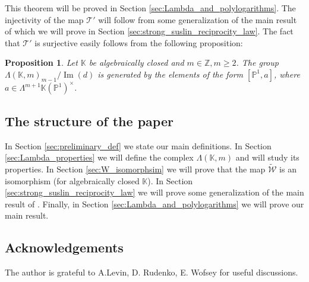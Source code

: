\documentclass[12pt]{extarticle}
\newtheorem{proposition}[theorem]{Proposition}
\def\mb{\mathbb}
\def\mc{\mathcal}
\def\L{\Lambda}
\def\k{\mb K}
\def\Z{\mb Z}
\def\t{\times}
\def\wt{\widetilde}
\renewcommand{\P}{{\mb P}}
\def\T{\mc T}
\def\W{\mc W}
\def \tW{\wt{\W}}
\def \wW{\tW}
\DeclareMathOperator{\im}{Im}
\begin{document}
This theorem will be proved in Section \ref{sec:Lambda_and_polylogarithms}. The injectivity of the map $\T'$ will follow from some generalization of the main result of \cite{bolbachan_2023_chow} which we will prove in Section \ref{sec:strong_suslin_reciprocity_law}. The fact that $\mc T'$ is surjective easily follows from the following proposition:

\begin{proposition}
\label{pr_intro:Lambda_is_generated_by_rationally_connected}
    Let $\k$ be algebraically closed and $m\in\Z, m\geq 2$. The group $\L(\k,m)_{m-1}/\im(d)$ is generated by the elements of the form $[\P^1, a]$, where  $a\in\L^{m+1}\k(\P^1)^\t$.
\end{proposition}


\subsection{The structure of the paper} In Section \ref{sec:preliminary_def} we state our main definitions. In Section \ref{sec:Lambda_properties} we will define the complex $\L(\k,m)$ and will study its properties. In Section \ref{sec:W_isomorphsim} we will prove that the map $\wW$ is an isomorphism (for algebraically closed $\k$). In Section \ref{sec:strong_suslin_reciprocity_law} we will prove some generalization of the main result of \cite{bolbachan_2023_chow}. Finally, in Section \ref{sec:Lambda_and_polylogarithms} we will prove our main result.

\subsection{Acknowledgements}
The author is grateful to A.Levin, D. Rudenko, E. Wofsey for useful discussions. 
\end{document}
